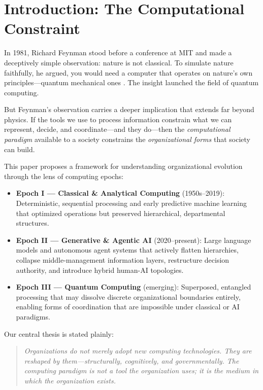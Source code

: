 \documentclass[11pt,a4paper,twocolumn]{article}
\begin{document}
\section{Introduction: The Computational Constraint}
\label{sec:introduction}

In 1981, Richard Feynman stood before a conference at MIT and made a deceptively simple observation: nature is not classical. To simulate nature faithfully, he argued, you would need a computer that operates on nature's own principles---quantum mechanical ones \cite{feynman1982}. The insight launched the field of quantum computing.

But Feynman's observation carries a deeper implication that extends far beyond physics. If the tools we use to process information constrain what we can represent, decide, and coordinate---and they do---then the \textit{computational paradigm} available to a society constrains the \textit{organizational forms} that society can build.

This paper proposes a framework for understanding organizational evolution through the lens of computing epochs:

\begin{itemize}[leftmargin=1.5em]
  \item \textbf{Epoch I --- Classical \& Analytical Computing} (1950s--2019): Deterministic, sequential processing and early predictive machine learning that optimized operations but preserved hierarchical, departmental structures.
  \item \textbf{Epoch II --- Generative \& Agentic AI} (2020--present): Large language models and autonomous agent systems that actively flatten hierarchies, collapse middle-management information layers, restructure decision authority, and introduce hybrid human-AI topologies.
  \item \textbf{Epoch III --- Quantum Computing} (emerging): Superposed, entangled processing that may dissolve discrete organizational boundaries entirely, enabling forms of coordination that are impossible under classical or AI paradigms.
\end{itemize}

Our central thesis is stated plainly:

\begin{quote}
\textit{Organizations do not merely adopt new computing technologies. They are reshaped by them---structurally, cognitively, and governmentally. The computing paradigm is not a tool the organization uses; it is the medium in which the organization exists.}
\end{quote}
\end{document}
